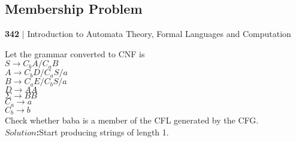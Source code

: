 \documentclass[a4,9pt]{beamer}
\begin{document}
\begin{frame}
\section*{Membership Problem}
 \begin{flushleft}
    \textbf{342}\hspace*{0.1cm} \textbf{$|$} \hspace*{0.1cm} Introduction to Automata Theory, Formal Languages and Computation
  \end{flushleft}
\vspace*{0.5cm}

 \hspace*{0.2cm} Let the grammar converted to CNF is\\

\vspace*{0.2cm}
\hspace*{4cm} $S \rightarrow C_{b}A/C_{a}B$ \\
\hspace*{4cm} $A \rightarrow C_{b}D/C_{a}S/a$ \\
\hspace*{4cm} $B \rightarrow C_{a}E/C_{b}S/a$ \\
\hspace*{4cm} $D \rightarrow AA$ \\
\hspace*{4cm} $\Sigma \rightarrow BB$ \\
\hspace*{4cm} $C_{a} \rightarrow a$ \\
\hspace*{4cm} $C_{b} \rightarrow b$ \\

\vspace*{0.2cm}
Check whether baba is a member of the CFL generated by the CFG.\\

\vspace*{0.2cm}
\textbf{$Solution$:}Start producing strings of length 1.\\

\vspace*{0.1cm}
\end{frame}
\end{document}
